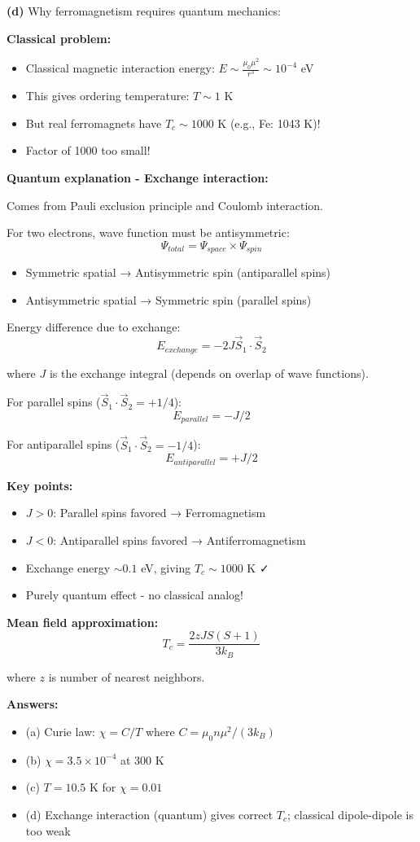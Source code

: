 \documentclass[12pt,a4paper]{article}
\begin{document}
\begin{solution}
\textbf{(d)} Why ferromagnetism requires quantum mechanics:

\textbf{Classical problem:}
\begin{itemize}
    \item Classical magnetic interaction energy: $E \sim \frac{\mu_0\mu^2}{r^3} \sim 10^{-4}$ eV
    \item This gives ordering temperature: $T \sim 1$ K
    \item But real ferromagnets have $T_c \sim 1000$ K (e.g., Fe: 1043 K)!
    \item Factor of 1000 too small!
\end{itemize}

\textbf{Quantum explanation - Exchange interaction:}

Comes from Pauli exclusion principle and Coulomb interaction.

For two electrons, wave function must be antisymmetric:
$$\Psi_{total} = \Psi_{space} \times \Psi_{spin}$$

\begin{itemize}
    \item Symmetric spatial → Antisymmetric spin (antiparallel spins)
    \item Antisymmetric spatial → Symmetric spin (parallel spins)
\end{itemize}

Energy difference due to exchange:
$$E_{exchange} = -2J\vec{S}_1 \cdot \vec{S}_2$$

where $J$ is the exchange integral (depends on overlap of wave functions).

For parallel spins ($\vec{S}_1 \cdot \vec{S}_2 = +1/4$):
$$E_{parallel} = -J/2$$

For antiparallel spins ($\vec{S}_1 \cdot \vec{S}_2 = -1/4$):
$$E_{antiparallel} = +J/2$$

\textbf{Key points:}
\begin{itemize}
    \item $J > 0$: Parallel spins favored → Ferromagnetism
    \item $J < 0$: Antiparallel spins favored → Antiferromagnetism
    \item Exchange energy $\sim 0.1$ eV, giving $T_c \sim 1000$ K ✓
    \item Purely quantum effect - no classical analog!
\end{itemize}

\textbf{Mean field approximation:}
$$T_c = \frac{2zJS(S+1)}{3k_B}$$

where $z$ is number of nearest neighbors.

\textbf{Answers:}
\begin{itemize}
    \item (a) Curie law: $\chi = C/T$ where $C = \mu_0 n\mu^2/(3k_B)$
    \item (b) $\chi = 3.5 \times 10^{-4}$ at 300 K
    \item (c) $T = 10.5$ K for $\chi = 0.01$
    \item (d) Exchange interaction (quantum) gives correct $T_c$; classical dipole-dipole is too weak
\end{itemize}
\end{solution}
\end{document}
